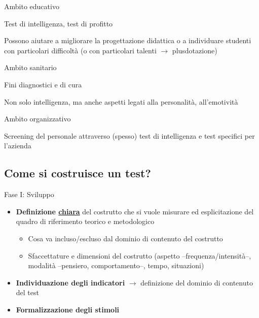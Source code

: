 \documentclass[compress]{beamer}
\begin{document}
\begin{frame}
	\begin{block}{Ambito educativo}
		
		Test di intelligenza, test di profitto
		
		Possono aiutare a migliorare la progettazione didattica o a individuare studenti con particolari difficoltà (o con particolari talenti $\rightarrow$ plusdotazione)
	\end{block}
	
	\begin{block}{Ambito sanitario}
		
		Fini diagnostici e di cura 
		
		Non solo intelligenza, ma anche aspetti legati alla personalità, all'emotività 
	\end{block}
	
	
	\begin{block}{Ambito organizzativo}
		
		Screening del personale attraverso (spesso) test di intelligenza e test specifici per l'azienda 
	\end{block}
\end{frame}

	\subsection{Come si costruisce un test?}

\begin{frame}{Fase I: Sviluppo}
	\begin{itemize}
		\item 	\textbf{Definizione \underline{chiara}} del costrutto che si vuole misurare ed esplicitazione del quadro di riferimento teorico e metodologico 
		\begin{itemize}
			\item Cosa va incluso/escluso dal dominio di contenuto del costrutto
			\item Sfaccettature e dimensioni del costrutto (aspetto --frequenza/intensità--, modalità --pensiero, comportamento--, tempo, situazioni)
		\end{itemize}
		
		
		\item 	\textbf{Individuazione degli indicatori} $\rightarrow$ definizione del dominio di contenuto del test
		
		
		
		\item 	\textbf{Formalizzazione degli stimoli} 
	\end{itemize}
	
	
\end{frame}
\end{document}
